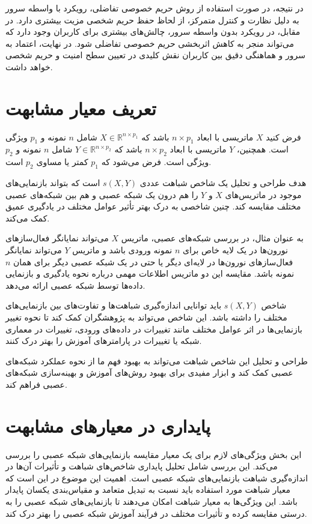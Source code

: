 در نتیجه، در صورت استفاده از روش حریم خصوصی تفاضلی، رویکرد با واسطه سرور به دلیل نظارت و کنترل متمرکز، از لحاظ حفظ حریم شخصی مزیت بیشتری دارد. در مقابل، در رویکرد بدون واسطه سرور، چالش‌های بیشتری برای کاربران وجود دارد که می‌تواند منجر به کاهش اثربخشی حریم خصوصی تفاضلی شود. در نهایت، اعتماد به سرور و هماهنگی دقیق بین کاربران نقش کلیدی در تعیین سطح امنیت و حریم شخصی خواهد داشت.



\section{
	تعریف معیار مشابهت
}
فرض کنید \( X \) ماتریسی با ابعاد \( n \times p_1 \) باشد که \( X \in \mathbb{R}^{n \times p_1} \) شامل \( n \) نمونه و \( p_1 \) ویژگی است. همچنین، \( Y \) ماتریسی با ابعاد \( n \times p_2 \) باشد که \( Y \in \mathbb{R}^{n \times p_2} \) شامل \( n \) نمونه و \( p_2 \) ویژگی است. فرض می‌شود که \( p_1 \) کمتر یا مساوی \( p_2 \) است.


هدف طراحی و تحلیل یک شاخص شباهت عددی \( s(X, Y) \) است که بتواند بازنمایی‌های%
موجود در ماتریس‌های \( X \) و \( Y \) را هم درون یک شبکه عصبی و هم بین شبکه‌های عصبی مختلف مقایسه کند. چنین شاخصی به درک بهتر تأثیر عوامل مختلف در یادگیری عمیق کمک می‌کند.

به عنوان مثال، در بررسی شبکه‌های عصبی، ماتریس \( X \) می‌تواند نمایانگر فعال‌سازهای%
نورون‌ها در یک لایه خاص برای \( n \) نمونه ورودی باشد و ماتریس \( Y \) می‌تواند نمایانگر فعال‌سازهای نورون‌ها در لایه‌ای دیگر یا حتی در یک شبکه عصبی دیگر برای همان \( n \) نمونه باشد. مقایسه این دو ماتریس اطلاعات مهمی درباره نحوه یادگیری و بازنمایی داده‌ها توسط شبکه عصبی ارائه می‌دهد.

شاخص \( s(X, Y) \) باید توانایی اندازه‌گیری شباهت‌ها و تفاوت‌های بین بازنمایی‌های مختلف را داشته باشد. این شاخص می‌تواند به پژوهشگران کمک کند تا نحوه تغییر بازنمایی‌ها در اثر عوامل مختلف مانند تغییرات در داده‌های ورودی، تغییرات در معماری شبکه یا تغییرات در پارامترهای آموزش را بهتر درک کنند.

طراحی و تحلیل این شاخص شباهت می‌تواند به بهبود فهم ما از نحوه عملکرد شبکه‌های عصبی کمک کند و ابزار مفیدی برای بهبود روش‌های آموزش و بهینه‌سازی شبکه‌های عصبی فراهم کند.


\section{
	پایداری در معیارهای مشابهت
}
این بخش ویژگی‌های لازم برای یک معیار مقایسه بازنمایی‌های شبکه عصبی را بررسی می‌کند. این بررسی شامل تحلیل پایداری شاخص‌های شباهت و تأثیرات آن‌ها در اندازه‌گیری شباهت بازنمایی‌های شبکه عصبی است. اهمیت این موضوع در این است که معیار شباهت مورد استفاده باید نسبت به تبدیل متعامد%
و مقیاس‌بندی یکسان%
پایدار باشد. این ویژگی‌ها به معیار شباهت امکان می‌دهند تا بازنمایی‌های شبکه عصبی را به درستی مقایسه کرده و تأثیرات مختلف در فرآیند آموزش شبکه عصبی را بهتر درک کند.


